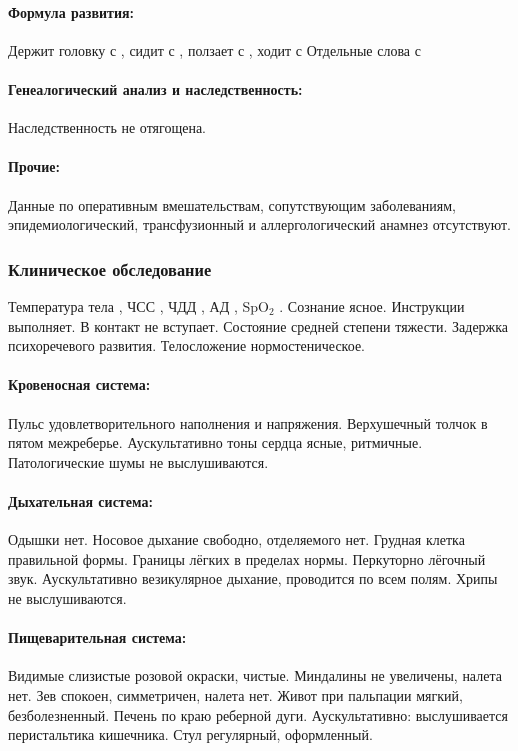 \documentclass[a4paper,14pt]{extarticle}
\newcommand{\months}{мес.}
\newcommand{\oCelsius}{\tcdegree{}C}
\newcommand{\bpm}{уд/мин}
\newcommand{\mpm}{/мин}
\newcommand{\torr}{торр}
\begin{document}
\paragraph{Формула развития:}
Держит головку с \numprint[\months]{2}, сидит с \numprint[\months]{7}, ползает с \numprint[\months]{11}, ходит с \numprint[\months]{22}
Отдельные слова с \numprint[\months]{10--11}

\paragraph{Генеалогический анализ и наследственность:} Наследственность не отягощена.

\paragraph{Прочие:} Данные по оперативным вмешательствам, сопутствующим заболеваниям, эпидемиологический, трансфузионный и аллергологический анамнез отсутствуют.

\subsubsection*{Клиническое обследование}

Температура тела \numprint[\oCelsius]{36.6}, ЧСС \numprint[\bpm]{122}, ЧДД \numprint[\mpm]{29}, АД \numprint[\torr]{80/55}, SpO$_2$ .
Сознание ясное.
Инструкции выполняет.
В контакт не вступает.
Состояние средней степени тяжести.
Задержка психоречевого развития.
Телосложение нормостеническое.

\paragraph{Кровеносная система:} Пульс удовлетворительного наполнения и напряжения. Верхушечный толчок в пятом межреберье. Аускультативно тоны сердца ясные, ритмичные. Патологические шумы не выслушиваются.

\paragraph{Дыхательная система:} Одышки нет. Носовое дыхание свободно, отделяемого нет. Грудная клетка правильной формы. Границы лёгких в пределах нормы. Перкуторно лёгочный звук. Аускультативно везикулярное дыхание, проводится по всем полям. Хрипы не выслушиваются.

\paragraph{Пищеварительная система:} Видимые слизистые розовой окраски, чистые. Миндалины не увеличены, налета нет. Зев спокоен, симметричен, налета нет. Живот при пальпации мягкий, безболезненный. Печень по краю реберной дуги. Аускультативно: выслушивается перистальтика кишечника. Стул регулярный, оформленный.
\end{document}

